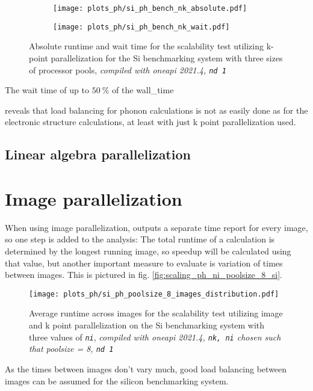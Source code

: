 \documentclass[main.tex]{subfiles}
\begin{document}
\begin{figure}[htb!]
    \begin{subfigure}[b]{0.49\textwidth}
        \centering
        \texttt{[image: plots\_ph/si\_ph\_bench\_nk\_absolute.pdf]}
    \end{subfigure}
    \begin{subfigure}[b]{0.49\textwidth}
        \centering
        \texttt{[image: plots\_ph/si\_ph\_bench\_nk\_wait.pdf]}
    \end{subfigure}
    \caption{Absolute runtime and wait time for the scalability test utilizing k-point parallelization for the Si benchmarking system with three sizes of processor pools, \emph{\QE compiled with \gls{oneapi} 2021.4, \texttt{nd 1}}}
    \label{fig:scaling_ph_nk_si_absolute_wait}
\end{figure}


The wait time of up to \(\SI{50}{\percent}\) of the \gls{wall_time} 

reveals that load balancing for phonon calculations is not as easily done as for the electronic structure calculations, at least with just k point parallelization used.



\subsection{Linear algebra parallelization}

\section{Image parallelization}\label{sec:scaling_ph_images}

When using image parallelization, \QE outputs a separate time report for every image, so one step is added to the analysis:
The total runtime of a calculation is determined by the longest running image, so speedup will be calculated using that value, but another important measure to evaluate is variation of times between images.
This is pictured in fig. \ref{fig:scaling_ph_ni_poolsize_8_si}.

\begin{figure}[ht!]
    \centering
    \texttt{[image: plots\_ph/si\_ph\_poolsize\_8\_images\_distribution.pdf]}
    \caption{Average runtime across images for the scalability test utilizing image and k point parallelization on the Si benchmarking system with three values of \emph{\texttt{ni}}, \emph{\QE compiled with \gls{oneapi} 2021.4, \texttt{nk, ni} chosen such that poolsize = 8, \texttt{nd 1}}}
    \label{fig:scaling_ph_ni_poolsize_8_si_distribution}
\end{figure}
As the times between images don't vary much, good load balancing between images can be assumed for the silicon benchmarking system.
\end{document}

